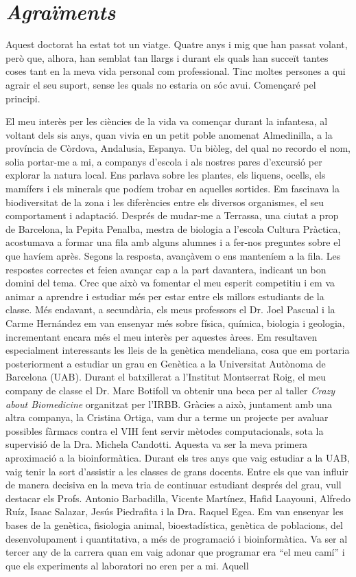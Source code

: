 \chapter*{\textit{Agraïments}} %

Aquest doctorat ha estat tot un viatge. Quatre anys i mig que han passat volant, però que, alhora, han semblat tan llargs i durant els quals han succeït tantes coses tant en la meva vida personal com professional. Tinc moltes persones a qui agrair el seu suport, sense les quals no estaria on sóc avui. Començaré pel principi.

El meu interès per les ciències de la vida va començar durant la infantesa, al voltant dels sis anys, quan vivia en un petit poble anomenat Almedinilla, a la província de Còrdova, Andalusia, Espanya. Un biòleg, del qual no recordo el nom, solia portar-me a mi, a companys d'escola i als nostres pares d'excursió per explorar la natura local. Ens parlava sobre les plantes, els liquens, ocells, els mamífers i els minerals que podíem trobar en aquelles sortides. Em fascinava la biodiversitat de la zona i les diferències entre els diversos organismes, el seu comportament i adaptació. Després de mudar-me a Terrassa, una ciutat a prop de Barcelona, la Pepita Penalba, mestra de biologia a l'escola Cultura Pràctica, acostumava a formar una fila amb alguns alumnes i a fer-nos preguntes sobre el que havíem après. Segons la resposta, avançàvem o ens manteníem a la fila. Les respostes correctes et feien avançar cap a la part davantera, indicant un bon domini del tema. Crec que això va fomentar el meu esperit competitiu i em va animar a aprendre i estudiar més per estar entre els millors estudiants de la classe. Més endavant, a secundària, els meus professors el Dr. Joel Pascual i la Carme Hernández em van ensenyar més sobre física, química, biologia i geologia, incrementant encara més el meu interès per aquestes àrees. Em resultaven especialment interessants les lleis de la genètica mendeliana, cosa que em portaria posteriorment a estudiar un grau en Genètica a la Universitat Autònoma de Barcelona (UAB). Durant el batxillerat a l'Institut Montserrat Roig, el meu company de classe el Dr. Marc Botifoll va obtenir una beca per al taller \textit{Crazy about Biomedicine} organitzat per l'IRBB. Gràcies a això, juntament amb una altra companya, la Cristina Ortiga, vam dur a terme un projecte per avaluar possibles fàrmacs contra el VIH fent servir mètodes computacionals, sota la supervisió de la Dra. Michela Candotti. Aquesta va ser la meva primera aproximació a la bioinformàtica. Durant els tres anys que vaig estudiar a la UAB, vaig tenir la sort d'assistir a les classes de grans docents. Entre els que van influir de manera decisiva en la meva tria de continuar estudiant després del grau, vull destacar els Profs. Antonio Barbadilla, Vicente Martínez, Hafid Laayouni, Alfredo Ruíz, Isaac Salazar, Jesús Piedrafita i la Dra. Raquel Egea. Em van ensenyar les bases de la genètica, fisiologia animal, bioestadística, genètica de poblacions, del desenvolupament i quantitativa, a més de programació i bioinformàtica. Va ser al tercer any de la carrera quan em vaig adonar que programar era ``el meu camí'' i que els experiments al laboratori no eren per a mi. Aquell 